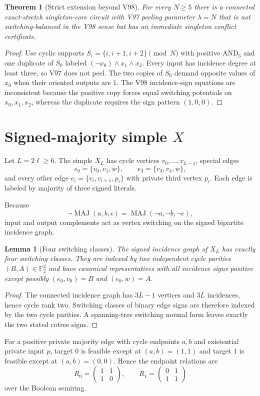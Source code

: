 \documentclass[11pt]{article}
\newtheorem{theorem}{Theorem}
\newtheorem{lemma}{Lemma}
\begin{document}
\begin{theorem}[Strict extension beyond V98]
For every $N\ge5$ there is a connected exact-stretch singleton-core circuit
with V97 peeling parameter $\lambda=N$ that is not switching-balanced in the
V98 sense but has an immediate singleton conflict certificate.
\end{theorem}
\begin{proof}
Use cyclic supports $S_i=\{i,i+1,i+2\}\pmod N$ with positive $\mathrm{AND}_3$
and one duplicate of $S_0$ labeled
$(\neg x_0)\wedge x_1\wedge x_2$. Every input has incidence degree at least
three, so V97 does not peel. The two copies of $S_0$ demand opposite values of
$x_0$ when their oriented outputs are $1$. The V98 incidence-sign equations are
inconsistent because the positive copy forces equal switching potentials on
$x_0,x_1,x_2$, whereas the duplicate requires the sign pattern $(1,0,0)$.
\end{proof}

\section{Signed-majority simple $X$}
Let $L=2\ell\ge6$. The simple $X_L$ has cycle vertices
$v_0,\dots,v_{L-1}$, special edges
\[
 e_0=\{v_0,v_1,w\},\qquad e_3=\{v_3,v_4,w\},
\]
and every other edge $e_i=\{v_i,v_{i+1},p_i\}$ with private third vertex
$p_i$. Each edge is labeled by majority of three signed literals.

Because
\[
 \neg\operatorname{MAJ}(a,b,c)=\operatorname{MAJ}(\neg a,\neg b,\neg c),
\]
input and output complements act as vertex switching on the signed bipartite
incidence graph.

\begin{lemma}[Four switching classes]
The signed incidence graph of $X_L$ has exactly four switching classes.
They are indexed by two independent cycle parities $(B,A)\in\mathbb F_2^2$ and
have canonical representatives with all incidence signs positive except
possibly $(e_0,v_0)=B$ and $(e_0,w)=A$.
\end{lemma}
\begin{proof}
The connected incidence graph has $3L-1$ vertices and $3L$ incidences, hence
cycle rank two. Switching classes of binary edge signs are therefore indexed by
the two cycle parities. A spanning-tree switching normal form leaves exactly the
two stated cotree signs.
\end{proof}

For a positive private majority edge with cycle endpoints $a,b$ and existential
private input $p$, target $0$ is feasible except at $(a,b)=(1,1)$ and target
$1$ is feasible except at $(a,b)=(0,0)$. Hence the endpoint relations are
\[
 R_0=\begin{pmatrix}1&1\\1&0\end{pmatrix},\qquad
 R_1=\begin{pmatrix}0&1\\1&1\end{pmatrix}
\]
over the Boolean semiring.
\end{document}
